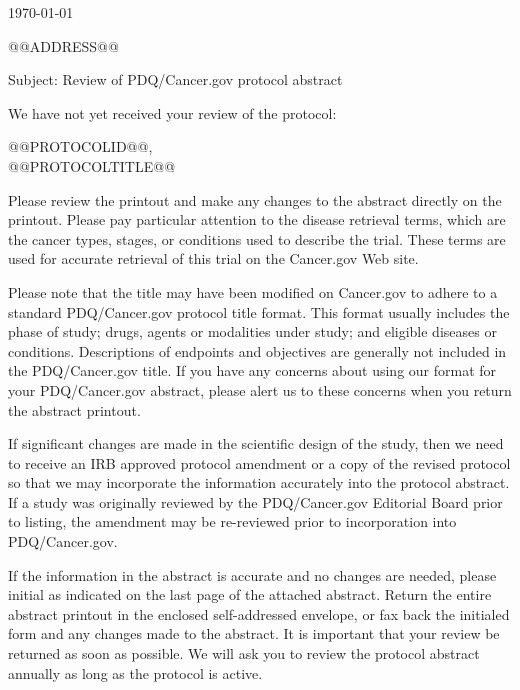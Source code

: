 \documentclass[letterpaper,12pt]{letter}
\begin{document}
\thispagestyle{empty}

\LetterheadWithLogo
  
\vspace{36pt}

\today

@@ADDRESS@@

\vspace{12pt}

Subject: Review of PDQ/Cancer.gov protocol abstract

We have not yet received your review of the protocol:

@@PROTOCOLID@@, \\
@@PROTOCOLTITLE@@

Please review the printout and make any changes to the abstract directly on
the printout.  Please pay particular attention to the disease retrieval terms,
which are the cancer types, stages, or conditions used to describe the
trial.  These terms are used for accurate retrieval of this trial on the
Cancer.gov Web site.

Please note that the title may have been modified on Cancer.gov to adhere to a
standard PDQ/Cancer.gov protocol title format.  This format usually includes
the phase of study; drugs, agents or modalities under study; and eligible
diseases or conditions.  Descriptions of endpoints and objectives are
generally not included in the PDQ/Cancer.gov title.  If you have any concerns
about using our format for your PDQ/Cancer.gov abstract, please alert us 
to these concerns when you return the abstract printout.

If significant changes are made in the scientific design of the study, then we
need to receive an IRB approved protocol amendment or a copy of the revised
protocol so that we may incorporate the information accurately into the
protocol abstract.  If a study was originally reviewed by the PDQ/Cancer.gov
Editorial Board prior to listing, the amendment may be re-reviewed prior to
incorporation into PDQ/Cancer.gov.

If the information in the abstract is accurate and no changes are needed,
please initial as indicated on the last page of the attached abstract.  Return
the entire abstract printout in the enclosed self-addressed envelope, or fax
back the initialed form and any changes made to the abstract.  It is important
that your review be returned as soon as possible.  We will ask you to review
the protocol abstract annually as long as the protocol is active.
\end{document}
